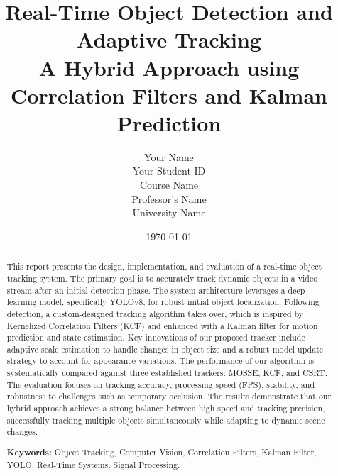 \documentclass[12pt, a4paper]{report}
\title{
    \huge Real-Time Object Detection and Adaptive Tracking \\
    \large A Hybrid Approach using Correlation Filters and Kalman Prediction
}
\author{
    Your Name \\
    Your Student ID \\
    \vspace{1cm}
    Course Name \\
    Professor's Name \\
    University Name
}
\date{\today}
\begin{document}
\maketitle


\begin{abstract}
    \noindent This report presents the design, implementation, and evaluation of a real-time object tracking system. The primary goal is to accurately track dynamic objects in a video stream after an initial detection phase. The system architecture leverages a deep learning model, specifically YOLOv8, for robust initial object localization. Following detection, a custom-designed tracking algorithm takes over, which is inspired by Kernelized Correlation Filters (KCF) and enhanced with a Kalman filter for motion prediction and state estimation. Key innovations of our proposed tracker include adaptive scale estimation to handle changes in object size and a robust model update strategy to account for appearance variations. The performance of our algorithm is systematically compared against three established trackers: MOSSE, KCF, and CSRT. The evaluation focuses on tracking accuracy, processing speed (FPS), stability, and robustness to challenges such as temporary occlusion. The results demonstrate that our hybrid approach achieves a strong balance between high speed and tracking precision, successfully tracking multiple objects simultaneously while adapting to dynamic scene changes.
    \vspace{1cm}
    
    \noindent \textbf{Keywords:} Object Tracking, Computer Vision, Correlation Filters, Kalman Filter, YOLO, Real-Time Systems, Signal Processing.
\end{abstract}

\tableofcontents
\listoffigures
\listoftables
\newpage

\end{document}
